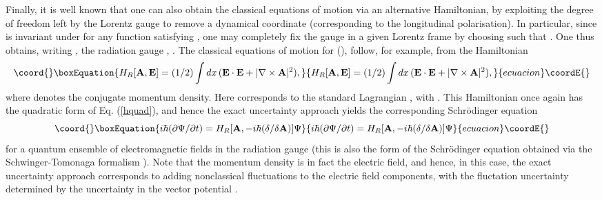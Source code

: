 \documentclass[a4paper,preprint, showpacs, aps, draft]{revtex4}
\begin{document}
{Finally, it is well known that one  can 
also obtain the classical equations of motion via an
alternative Hamiltonian, by exploiting the degree of freedom left by the
Lorentz gauge to remove a dynamical 
coordinate (corresponding to the longitudinal polarisation).  In
particular, since \coordHE{} is invariant under 
\coordHE{} for any function \myHighlight{$\chi$}\coordHE{}
satisfying \coordHE{}, one may completely
fix the gauge in a given Lorentz frame by choosing \myHighlight{$\chi$}\coordHE{} such that
\coordHE{}.  One thus obtains, writing \coordHE{}, the
radiation gauge \coordHE{}, \coordHE{}.  The classical
equations of motion for
\coordHE{} (\coordHE{}), follow, for example,
from the Hamiltonian 
\begin{equation}\coord{}\boxEquation{ \label{hc}
H_R[{\bf A},{\bf E}] = (1/2)\int dx\, ({\bf E}\cdot{\bf E} +
|\nabla\times{\bf A}|^2) ,
}{ H_R[{\bf A},{\bf E}] = (1/2)\int dx\, ({\bf E}\cdot{\bf E} +
|\nabla\times{\bf A}|^2) ,
}{ecuacion}\coordE{}\end{equation}
where \coordHE{} denotes the conjugate momentum density. Here \coordHE{}
corresponds to the standard Lagrangian \coordHE{},
with  \coordHE{}.  This Hamiltonian once again has the quadratic
form of Eq. (\ref{hquad}), and hence the exact uncertainty approach 
yields the corresponding Schr\"{o}dinger equation
\begin{equation}\coord{}\boxEquation{
i\hbar(\partial\Psi/\partial t) = H_R[{\bf A},-i\hbar(\delta/\delta {\bf
A})]\Psi
}{
i\hbar(\partial\Psi/\partial t) = H_R[{\bf A},-i\hbar(\delta/\delta {\bf
A})]\Psi
}{ecuacion}\coordE{}\end{equation} 
for a quantum ensemble of electromagnetic 
fields in the radiation gauge  (this is also
the form of the Schr\"{o}dinger equation obtained via the
Schwinger-Tomonaga formalism \cite{wheeler}).  Note that 
the momentum
density \coordHE{} is in fact the electric field, and hence, in this
case, the exact uncertainty approach corresponds to adding nonclassical
fluctuations to the electric field components, with the fluctation uncertainty
determined by the uncertainty in the vector potential \coordHE{}.

}
\end{document}
